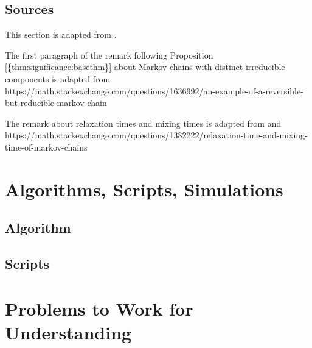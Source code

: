 \documentclass[12pt]{article}
\begin{document}
\subsection*{Sources} This section is adapted from
\cite{Chikina2860, Chikina2019, doi:10.1080/2330443X.2020.1806763}.

    
The first paragraph of the remark following Proposition~%
\ref{{thm:significance:basethm}} about Markov chains with distinct
irreducible components is adapted from
https://math.stackexchange.com/questions/1636992/an-example-of-a-reversible-but-reducible-markov-chain

The remark about relaxation times and mixing times is adapted from
\cite{levin09} and
https://math.stackexchange.com/questions/1382222/relaxation-time-and-mixing-time-of-markov-chains

\hr

\section*{Algorithms, Scripts, Simulations}

\subsection*{Algorithm}

\subsection*{Scripts}


\hr

\section*{Problems to Work for Understanding}
\renewcommand{\theexerciseseries}{}
\renewcommand{\theexercise}{\arabic{exercise}}
\end{document}
